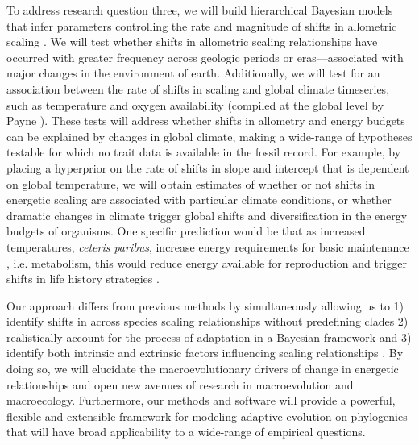 \documentclass[10pt, a4paper]{article}
\begin{document}
To address research question three, we will build hierarchical Bayesian models that infer parameters controlling the rate and magnitude of shifts in allometric scaling \cite{Gelman2003}. We will test whether shifts in allometric scaling relationships have occurred with greater frequency across geologic periods or eras---associated with major changes in the environment of earth. Additionally, we will test for an association between the rate of shifts in scaling and global climate timeseries, such as temperature and oxygen availability (compiled at the global level by Payne \cite{Payne2013}). These tests will address whether shifts in allometry and energy budgets can be explained by changes in global climate, making a wide-range of hypotheses testable for which no trait data is available in the fossil record. For example, by placing a hyperprior on the rate of shifts in slope and intercept that is dependent on global temperature, we will obtain estimates of whether or not shifts in energetic scaling are associated with particular climate conditions, or whether dramatic changes in climate trigger global shifts and diversification in the energy budgets of organisms. One specific prediction would be that as increased temperatures, \textit{ceteris paribus}, increase energy requirements for basic maintenance \cite{Gillooly2001}, i.e. metabolism, this would reduce energy available for reproduction and trigger shifts in life history strategies \cite{Kearney2012}.\

Our approach differs from previous methods by simultaneously allowing us to 1) identify shifts in across species scaling relationships without predefining clades 2) realistically account for the process of adaptation in a Bayesian framework and 3) identify both intrinsic and extrinsic factors influencing scaling relationships \cite{HansenBartoszek2012, UyedaHarmon2014, HoAne2014}. By doing so, we will elucidate the macroevolutionary drivers of change in energetic relationships and open new avenues of research in macroevolution and macroecology. Furthermore, our methods and software will provide a powerful, flexible and extensible framework for modeling adaptive evolution on phylogenies that will have broad applicability to a wide-range of empirical questions.
\end{document}
